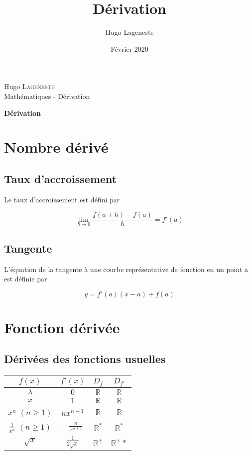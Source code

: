 \documentclass[a4paper]{article}
\title{Dérivation}
\author{Hugo Lageneste}
\date{Février 2020}
\begin{document}
{Hugo \textsc{Lageneste}}\\
{Mathématiques - Dérivation}

\begin{center}
 \newcommand{\HRule}{\rule{\linewidth}{0.5mm}}
 {\huge \bfseries Dérivation}\\[0.1cm]
\end{center}

\section{Nombre dérivé}
\subsection{Taux d'accroissement}

{Le taux d'accroissement est défini par}

\[\lim\limits_{h \rightarrow 0}\frac{f(a+h)-f(a)}{h}=f\prime (a)\]

\subsection{Tangente}

{L'équation de la tangente à une courbe représentative de fonction en un point a est définie par}

\[y=f\prime(a)(x-a)+f(a)\]

\section{Fonction dérivée}

\subsection{Dérivées des fonctions usuelles}
\begin{center}
	\begin{tabular}{|c|c|c|c|}
  		\hline
  		$f(x)$ & $f\prime(x)$ & $D_f$ & $D_{f\prime}$ \\	
  		\hline
  		$\lambda$ & $0$ & $\mathbb{R}$ & $\mathbb{R}$ \\
  		\hline
  		$x$ & $1$ & $\mathbb{R}$ & $\mathbb{R}$ \\
  		\hline
  		$x^n$ $(n \geq 1)$ & $nx^{n-1}$ & $\mathbb{R}$ & $\mathbb{R}$ \\
  		\hline
  		$\frac{1}{x^n}$ $(n \geq 1)$ & $-\frac{n}{x^{n+1}}$ & $\mathbb{R}^*$ & $\mathbb{R}^*$ \\
  		\hline
  		$\sqrt{x}$ & $\frac{1}{2\sqrt{x}}$ & $\mathbb{R}^+$ & $\mathbb{R}^+*$ \\
  		\hline
	\end{tabular}
\end{center}
\end{document}
